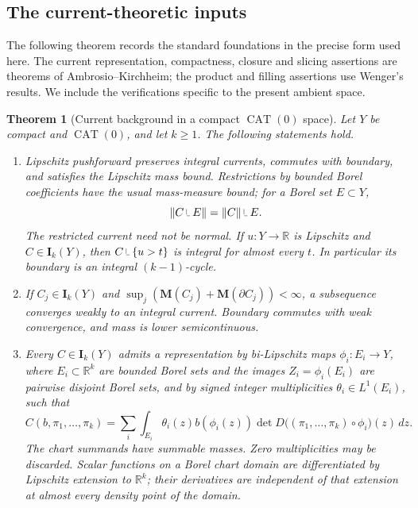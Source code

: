 \documentclass[11pt]{article}
\numberwithin{equation}{section}
\newtheorem{theorem}{Theorem}[section]
\theoremstyle{definition}
\theoremstyle{remark}
\newcommand{\R}{\mathbb R}
\newcommand{\I}{\mathbf I}
\newcommand{\M}{\mathbf M}
\newcommand{\dd}{\,d}
\newcommand{\restr}{\mathbin{\vrule height 1.4ex depth -0.3ex width .07ex\vrule height .07ex depth 0ex width .7ex}}
\begin{document}
\subsection{The current-theoretic inputs}

The following theorem records the standard foundations in the precise
form used here. The current representation, compactness, closure and
slicing assertions are theorems of Ambrosio--Kirchheim; the product and
filling assertions use Wenger's results. We include the verifications
specific to the present ambient space.

\begin{theorem}[Current background in a compact \(\operatorname{CAT}(0)\) space]
\label{thm:current-background}
Let \(Y\) be compact and \(\operatorname{CAT}(0)\), and let \(k\ge1\).
The following statements hold.
\begin{enumerate}[label=\textup{(\roman*)}]
\item Lipschitz pushforward preserves integral currents, commutes with
boundary, and satisfies the Lipschitz mass bound. Restrictions by bounded
Borel coefficients have the usual mass-measure bound; for a Borel set
\(E\subset Y\),
\[
 \|C\restr E\|=\|C\|\restr E.
\]
The restricted current need not be normal. If \(u:Y\to\R\)
is Lipschitz and \(C\in\I_k(Y)\), then
\(C\restr\{u>t\}\) is integral for almost every \(t\).
In particular its boundary is an integral \((k-1)\)-cycle.

\item If \(C_j\in\I_k(Y)\) and
\(\sup_j(\M(C_j)+\M(\partial C_j))<\infty\), a subsequence converges
weakly to an integral current. Boundary commutes with weak convergence,
and mass is lower semicontinuous.

\item Every \(C\in\I_k(Y)\) admits a representation by bi-Lipschitz
maps \(\phi_i:E_i\to Y\), where \(E_i\subset\R^k\) are bounded Borel
sets and the images \(Z_i=\phi_i(E_i)\) are pairwise disjoint Borel sets,
and by signed integer multiplicities \(\theta_i\in L^1(E_i)\), such that
\begin{equation}
\label{eq:chart-action}
 C(b,\pi_1,\ldots,\pi_k)
 =\sum_i\int_{E_i}\theta_i(z)b(\phi_i(z))
       \det D\bigl((\pi_1,\ldots,\pi_k)\circ\phi_i\bigr)(z)\dd z.
\end{equation}
The chart summands have summable masses. Zero multiplicities may be
discarded. Scalar functions on a Borel chart domain are differentiated
by Lipschitz extension to \(\R^k\); their derivatives are independent
of that extension at almost every density point of the domain.


\end{enumerate}
\end{theorem}
\end{document}
